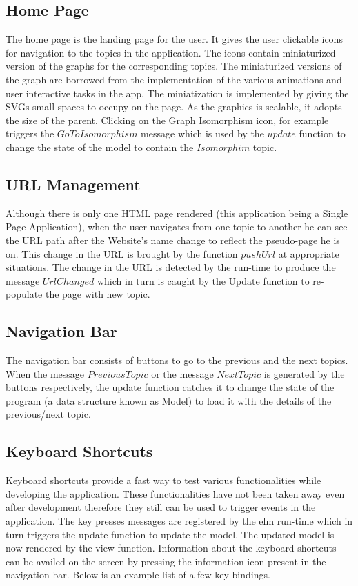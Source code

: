 \subsection{Home Page}
The home page is the landing page for the user. It gives the user clickable
icons for navigation to the topics in the application. The icons contain
miniaturized version of the graphs for the corresponding topics. The
miniaturized versions of the graph are borrowed from the implementation of the
various animations and user interactive tasks in the app. The miniatization is
implemented by giving the SVGs small spaces to occupy on the page. As the
graphics is scalable, it adopts the size of the parent. Clicking on the Graph
Isomorphism icon, for example triggers the $GoToIsomorphism$ message which is
used by the $update$ function to change the state of the model to contain
the $Isomorphim$ topic.


\subsection{URL Management}
Although there is only one HTML page rendered (this application being a Single
Page Application), when the user navigates from one topic to another he can see
the URL path after the Website's name change to reflect the pseudo-page he is
on. This change in the URL is brought by the function $pushUrl$ at
appropriate situations.  The change in the URL is detected by the run-time to
produce the message $UrlChanged$ which in turn is caught by the Update function
to re-populate the page with new topic.

\subsection{Navigation Bar}
The navigation bar consists of buttons to go to the previous and the next
topics.  When the message $PreviousTopic$ or the message $NextTopic$ is
generated by the buttons respectively, the update function catches it to change
the state of the program (a data structure known as Model) to load it with the
details of the previous/next topic.

\subsection{Keyboard Shortcuts}
Keyboard shortcuts provide a fast way to test various functionalities while
developing the application.  These functionalities have not been taken away
even after development therefore they still can be used to trigger events in
the application. 
The key presses messages are registered by the elm run-time which in turn
triggers the update function to update the model. The updated model is now
rendered by the view function. Information about the keyboard shortcuts can be
availed on the screen by pressing the information icon present in the
navigation bar. Below is an example list of a few key-bindings.

